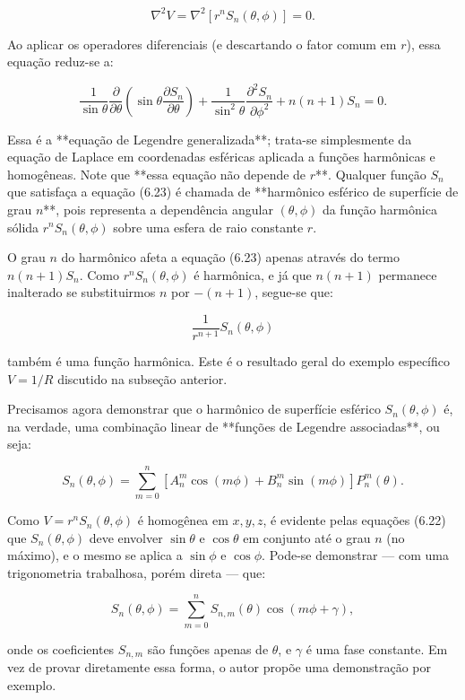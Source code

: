 $$
\nabla^2 V = \nabla^2 \left[ r^n S_n(\theta, \phi) \right] = 0.
$$

Ao aplicar os operadores diferenciais (e descartando o fator comum em $r$), essa equação reduz-se a:

$$
\frac{1}{\sin\theta} \frac{\partial}{\partial \theta} \left( \sin\theta \frac{\partial S_n}{\partial \theta} \right)
+ \frac{1}{\sin^2\theta} \frac{\partial^2 S_n}{\partial \phi^2}
+ n(n+1) S_n = 0. \tag{6.23}
$$

Essa é a **equação de Legendre generalizada**; trata-se simplesmente da equação de Laplace em coordenadas esféricas aplicada a funções harmônicas e homogêneas. Note que **essa equação não depende de $r$**. Qualquer função $S_n$ que satisfaça a equação (6.23) é chamada de **harmônico esférico de superfície de grau $n$**, pois representa a dependência angular $(\theta, \phi)$ da função harmônica sólida $r^n S_n(\theta, \phi)$ sobre uma esfera de raio constante $r$.

O grau $n$ do harmônico afeta a equação (6.23) apenas através do termo $n(n + 1) S_n$. Como $r^n S_n(\theta, \phi)$ é harmônica, e já que $n(n+1)$ permanece inalterado se substituirmos $n$ por $-(n + 1)$, segue-se que:

$$
\frac{1}{r^{n+1}} S_n(\theta, \phi)
$$

também é uma função harmônica. Este é o resultado geral do exemplo específico $V = 1/R$ discutido na subseção anterior.


Precisamos agora demonstrar que o harmônico de superfície esférico $S_n(\theta, \phi)$ é, na verdade, uma combinação linear de **funções de Legendre associadas**, ou seja:

$$
S_n(\theta, \phi) = \sum_{m=0}^{n} \left[ A_{n}^{m} \cos(m\phi) + B_{n}^{m} \sin(m\phi) \right] P_{n}^{m}(\theta). \tag{6.24}
$$

Como $V = r^n S_n(\theta, \phi)$ é homogênea em $x, y, z$, é evidente pelas equações (6.22) que $S_n(\theta, \phi)$ deve envolver $\sin\theta$ e $\cos\theta$ em conjunto até o grau $n$ (no máximo), e o mesmo se aplica a $\sin\phi$ e $\cos\phi$. Pode-se demonstrar — com uma trigonometria trabalhosa, porém direta — que:

$$
S_n(\theta, \phi) = \sum_{m=0}^{n} S_{n,m}(\theta) \cos(m\phi + \gamma), \tag{6.25}
$$

onde os coeficientes $S_{n,m}$ são funções apenas de $\theta$, e $\gamma$ é uma fase constante. Em vez de provar diretamente essa forma, o autor propõe uma demonstração por exemplo.

